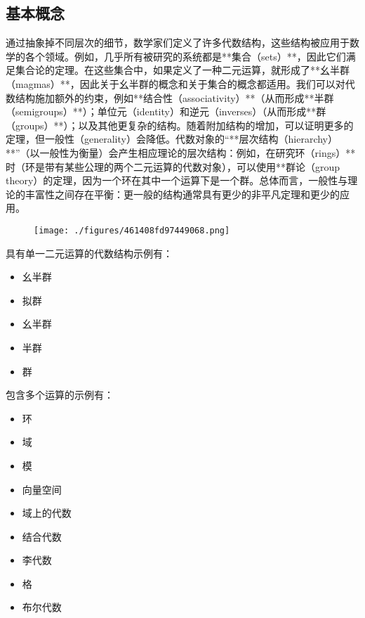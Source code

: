 \subsection{基本概念}
通过抽象掉不同层次的细节，数学家们定义了许多代数结构，这些结构被应用于数学的各个领域。例如，几乎所有被研究的系统都是**集合（sets）**，因此它们满足集合论的定理。在这些集合中，如果定义了一种二元运算，就形成了**幺半群（magmas）**，因此关于幺半群的概念和关于集合的概念都适用。我们可以对代数结构施加额外的约束，例如**结合性（associativity）**（从而形成**半群（semigroups）**）；单位元（identity）和逆元（inverses）（从而形成**群（groups）**）；以及其他更复杂的结构。随着附加结构的增加，可以证明更多的定理，但一般性（generality）会降低。代数对象的“**层次结构（hierarchy）**”（以一般性为衡量）会产生相应理论的层次结构：例如，在研究\*\*环（rings）**时（环是带有某些公理的两个二元运算的代数对象），可以使用**群论（group theory）\*\*的定理，因为一个环在其中一个运算下是一个群。总体而言，一般性与理论的丰富性之间存在平衡：更一般的结构通常具有更少的非平凡定理和更少的应用。
\begin{figure}[ht]
\centering
\texttt{[image: ./figures/461408fd97449068.png]}
\caption{} \label{fig_CXds_2}
\end{figure}
具有单一二元运算的代数结构示例有：
\begin{itemize}
\item 幺半群
\item 拟群
\item 幺半群
\item 半群
\item 群
\end{itemize}
包含多个运算的示例有：
\begin{itemize}
\item 环
\item 域
\item 模
\item 向量空间
\item 域上的代数
\item 结合代数
\item 李代数
\item 格
\item 布尔代数
\end{itemize}


